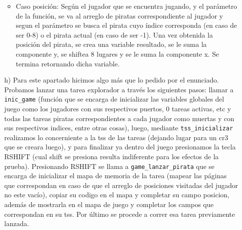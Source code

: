\begin{enumerate}
\begin{itemize}
\item Caso posición: Según el jugador que se encuentra jugando, y el parámetro de la función, se va al arreglo de piratas correspondiente al jugador y segun el parámetro se busca el pirata cuyo índice corresponda (en caso de ser 0-8) o el pirata actual (en caso de ser -1). Una vez obtenida la posición del pirata, se crea una variable resultado, se le suma la componente y, se shiftea 8 lugares y se le suma la componente x. Se termina retornando dicha variable.
\end{itemize}
\item[h)]Para este apartado hicimos algo más que lo pedido por el enunciado. Probamos lanzar una tarea explorador a través los siguientes pasos: llamar a {\tt inic_game} (función que se encarga de inicializar las variables globales del juego como los jugadores con sus respectivos puertos, 0 tareas activas, etc y todas las tareas piratas correspondientes a cada jugador como muertas y con sus respectivos indices, entre otras cosas), luego, mediante {\tt tss_inicializar} realizamos lo concerniente a la tss de las tareas (dejando lugar para un cr3 que se creara luego), y para finalizar ya dentro del juego presionamos la tecla RSHIFT (cual shift se presiona resulta indiferente para los efectos de la prueba). Presionando RSHIFT se llama a {\tt game_lanzar_pirata} que se encarga de inicializar el mapa de memoria de la tarea (mapear las páginas que correspondan en caso de que el arreglo de posiciones visitadas del jugador no este vacío), copiar su codigo en el mapa y completar su campo posicion, además de mostrarla en el mapa de juego y completar los campos que correspondan en su tss. Por último se procede a correr esa tarea previamente lanzada.

\end{enumerate}
